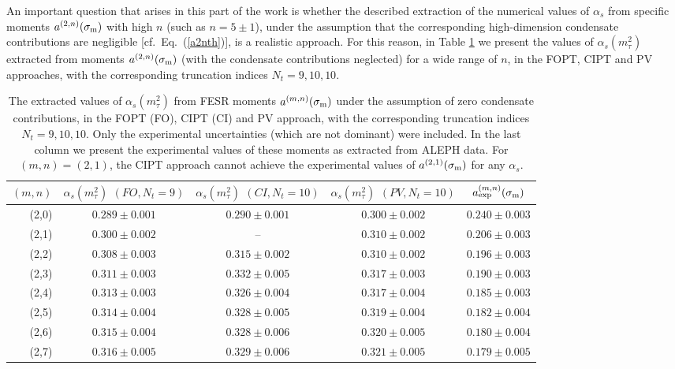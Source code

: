 \documentclass[aps,nofootinbib,showkeys,noshowpacs,preprintnumbers,amsmath,amssymb]{revtex4}
\newcommand{\sm}{{\sigma_{\rm m}}}
\begin{document}
An important question that arises in this part of the work is whether the described extraction of the numerical values of $\alpha_s$ from specific moments $a^{(2,n)}(\sm)$ with high $n$ (such as $n=5 \pm 1$), under the assumption that the corresponding high-dimension condensate contributions are negligible [cf.~Eq.~(\ref{a2nth})], is a realistic approach. For this reason, in Table \ref{taba2n} we present the values of $\alpha_s(m_{\tau}^2)$ extracted from moments $a^{(2,n)}(\sm)$ (with the condensate contributions neglected) for a wide range of $n$, in the FOPT, CIPT and PV approaches, with the corresponding truncation indices $N_t=9, 10, 10$.
\begin{table}
  \caption{The extracted values of $\alpha_s(m_{\tau}^2)$ from FESR moments $a^{(m,n)}(\sm)$ under the assumption of zero condensate contributions, in the FOPT (FO), CIPT (CI) and PV approach, with the corresponding truncation indices $N_t=9, 10, 10$. Only the experimental uncertainties (which are not dominant) were included. In the last column we present the experimental values of these moments as extracted from ALEPH data. For $(m,n)=(2,1)$, the CIPT approach cannot achieve the experimental values of $a^{(2,1)}(\sm)$ for any $\alpha_s$.}
\label{taba2n}
\begin{ruledtabular}
\begin{tabular}{r|ccc|c}
  $(m,n)$ & $\alpha_s(m_{\tau}^2)$ $(FO, N_t=9)$ & $\alpha_s(m_{\tau}^2)$ $(CI, N_t=10)$  & $\alpha_s(m_{\tau}^2)$ $(PV, N_t=10)$ & $a^{(m,n)}_{\rm exp}(\sm)$
  \\
\hline
(2,0)       &  $0.289 \pm 0.001$ & $0.290 \pm 0.001$ &  $0.300 \pm 0.002$ & $0.240 \pm 0.003$ \\
(2,1)       &  $0.300 \pm 0.002$ & --  &  $0.310 \pm 0.002$ & $0.206 \pm 0.003$ \\
(2,2)       &  $0.308 \pm 0.003$ & $0.315 \pm 0.002$ &  $0.310 \pm 0.002$ & $0.196 \pm 0.003$ \\
(2,3)       &  $0.311 \pm 0.003$ & $0.332 \pm 0.005$ &  $0.317 \pm 0.003$ & $0.190 \pm 0.003$ \\
(2,4)       &  $0.313 \pm 0.003$ & $0.326 \pm 0.004$ &  $0.317 \pm 0.004$ & $0.185 \pm 0.003$ \\
(2,5)       &  $0.314 \pm 0.004$ & $0.328 \pm 0.005$ &  $0.319 \pm 0.004$ & $0.182 \pm 0.004$ \\
(2,6)       &  $0.315 \pm 0.004$ & $0.328 \pm 0.006$ &  $0.320 \pm 0.005$ & $0.180 \pm 0.004$ \\
(2,7)       &  $0.316 \pm 0.005$ & $0.329 \pm 0.006$ &  $0.321 \pm 0.005$ & $0.179 \pm 0.005$ \\

\end{tabular}
\end{ruledtabular}
\end{table}
\end{document}
